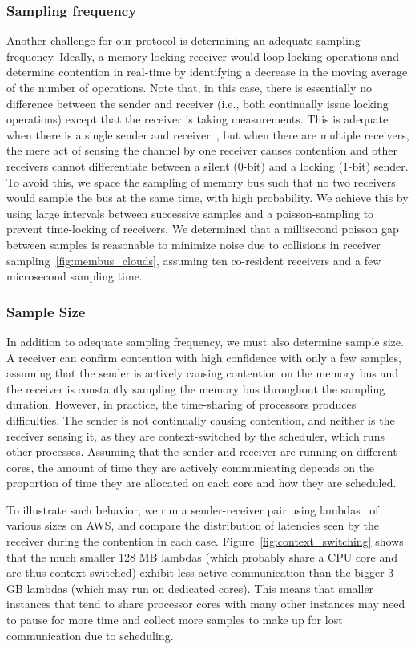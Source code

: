 \subsubsection{Sampling frequency}
Another challenge for our protocol is determining an adequate sampling
frequency. Ideally, a memory locking receiver would loop locking operations and
determine contention in real-time by identifying a decrease in the moving
average of the number of operations. Note that, in this case, there is
essentially no difference between the sender and receiver (i.e., both
continually issue locking operations) except that the receiver is taking
measurements. This is adequate when there is a single sender and
receiver~\cite{varadarajan2015}, but when there are multiple receivers, the mere
act of sensing the channel by one receiver causes contention and other receivers
cannot differentiate between a silent (0-bit) and a locking (1-bit) sender. To
avoid this, we space the sampling of memory bus such that no two receivers would
sample the bus at the same time, with high probability. We achieve this by
using large intervals between successive samples and a poisson-sampling to
prevent time-locking of receivers. We determined that a millisecond poisson gap
between samples is reasonable to minimize noise due to collisions in receiver
sampling~\ref{fig:membus_clouds}, assuming ten co-resident receivers and a few
microsecond sampling time. 

\subsubsection{Sample Size} 
\label{sec:method:samplingdur}
In addition to adequate sampling frequency, we must also determine sample size.  
A receiver can confirm contention with high confidence with only a
few samples, assuming that the sender is actively causing contention on the
memory bus and the receiver is constantly sampling the memory bus throughout the
sampling duration. However, in practice, the time-sharing of processors
produces difficulties. The sender is not continually causing contention, and
neither is the receiver sensing it, as they are context-switched by the
scheduler, which runs other processes. Assuming that the sender and receiver are
running on different cores, the amount of time they are actively communicating
depends on the proportion of time they are allocated on each core and how they
are scheduled. 

To illustrate such behavior, we run a sender-receiver pair using
lambdas~\cite{awslambda} of various sizes on AWS, and compare the distribution
of latencies seen by the receiver during the contention in each case.
Figure~\ref{fig:context_switching} shows that the much smaller 128 MB lambdas
(which probably share a CPU core and are thus context-switched) exhibit less
active communication than the bigger 3 GB lambdas (which may run on dedicated
cores). This means that smaller instances that tend to share processor cores
with many other instances may need to pause for more time and collect more
samples to make up for lost communication due to scheduling.


